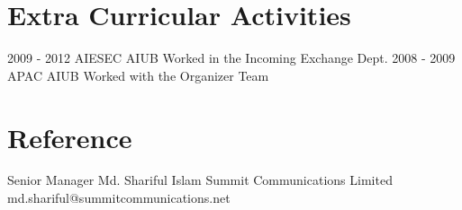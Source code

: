 \documentclass[]{cv-style} %
\begin{document}
\section{Extra Curricular Activities}
\begin{entrylist}
\entry
{2009 - 2012}
{AIESEC}
{AIUB}
{Worked in the Incoming Exchange Dept.}
\entry
{2008 - 2009}
{APAC}
{AIUB}
{Worked with the Organizer Team}
\end{entrylist}
\section{Reference}
\begin{entrylist}
\entry
{Senior Manager}
{Md. Shariful Islam}
{Summit Communications Limited}
{md.shariful@summitcommunications.net}
\end{entrylist}
\end{document}
